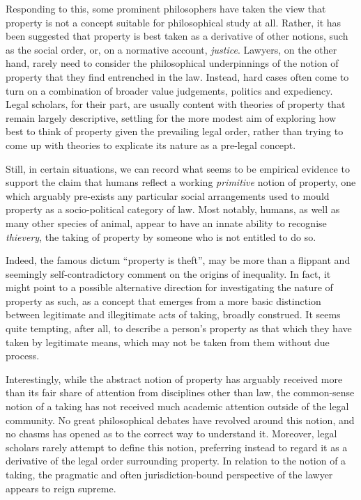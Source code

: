Responding to this, some prominent philosophers have taken the view that property is not a concept suitable for philosophical study at all. Rather, it has been suggested that property is best taken as a derivative of other notions, such as the social order, or, on a normative account, {\it justice}.
Lawyers, on the other hand, rarely need to consider the philosophical underpinnings of the notion of property that they find entrenched in the law. Instead, hard cases often come to turn on a combination of broader value judgements, politics and expediency. Legal scholars, for their part, are usually content with theories of property that remain largely descriptive, settling for the more modest aim of exploring how best to think of property given the prevailing legal order, rather than trying to come up with theories to explicate its nature as a pre-legal concept.

Still, in certain situations, we can record what seems to be empirical evidence to support the claim that humans reflect a working {\it primitive} notion of property, one which arguably pre-exists any particular social arrangements used to mould property as a socio-political category of law. Most notably, humans, as well as many other species of animal, appear to have an innate ability to recognise {\it thievery}, the taking of property by someone who is not entitled to do so.

Indeed, the famous dictum ``property is theft'', may be more than a flippant and seemingly self-contradictory comment on the origins of inequality. In fact, it might point to a possible alternative direction for investigating the nature of property as such, as a concept that emerges from a more basic distinction between legitimate and illegitimate acts of taking, broadly construed. It seems quite tempting, after all, to describe a person's property as that which they have taken by legitimate means, which may not be taken from them without due process.

Interestingly, while the abstract notion of property has arguably received more than its fair share of attention from disciplines other than law, the common-sense notion of a taking has not received much academic attention outside of the legal community. No great philosophical debates have revolved around this notion, and no chasms has opened as to the correct way to understand it. Moreover, legal scholars rarely attempt to define this notion, preferring instead to regard it as a derivative of the legal order surrounding property. In relation to the notion of a taking, the pragmatic and often jurisdiction-bound perspective of the lawyer appears to reign supreme.

